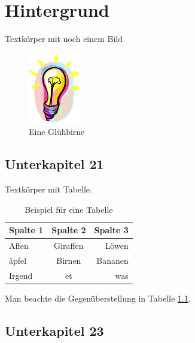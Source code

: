 %
%
% 
% 
% 


\chapter{Hintergrund}
\label{chap:back}

Textkörper mit noch einem Bild

\begin{figure}[htbp]
	\centering
		\includegraphics{images/birne}
	\caption{Eine Glühbirne}
	\label{fig:birne}
\end{figure}



\section{Unterkapitel 21}
\label{sec:Unterkapitel21}

Textkörper mit Tabelle.

\begin{table}[htbp]
	\centering
		\begin{tabular}{|l|c|r|}
		\hline
		\rowcolor[gray]{0.9}
		Spalte 1 & Spalte 2 & Spalte 3 \\
		\hline
		Affen & Giraffen & Löwen \\
		äpfel & Birnen & Bananen \\
		Irgend & et & was \\
		\hline	
		\end{tabular}
	\caption{Beispiel für eine Tabelle}
	\label{tab:BeispielFuerEineTabelle}
\end{table}

Man beachte die Gegenüberstellung in Tabelle \ref{tab:BeispielFuerEineTabelle}.

\section{Unterkapitel 23}
\label{sec:Unterkapite23}

